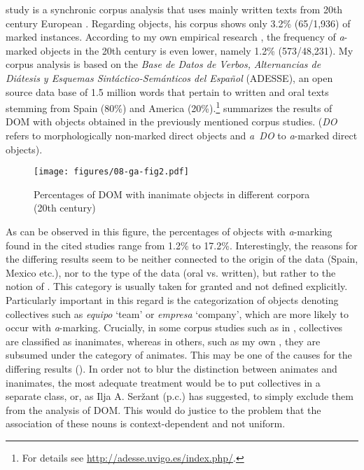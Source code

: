 \documentclass[output=paper]{LSP/langsci}
\begin{document}
 study is a synchronic corpus analysis that uses mainly written texts from 20th century European . Regarding  objects, his corpus shows only 3.2\% (65/1,936) of marked instances. According to my own empirical research \citep[71]{GarciaGarcia2014Objektmarkierung}, the frequency of \textit{a}-marked  objects in the 20th century is even lower, namely 1.2\% (573/48,231). My corpus analysis is based on the \textit{Base de Datos de Verbos,} \textit{Alternancias de Diátesis y Esquemas Sintáctico-Semánticos del Español} (ADESSE), an open source data base of 1.5 million words that pertain to written and oral texts stemming from Spain (80\%) and  America (20\%).\footnote{For details see \url{http://adesse.uvigo.es/index.php/}.}  summarizes the results of DOM with  objects obtained in the previously mentioned corpus studies. (\textit{DO} refers to morphologically non-marked direct objects and \textit{a~DO} to \textit{a}-marked direct objects). 

\begin{figure}
\texttt{[image: figures/08-ga-fig2.pdf]}
\caption{Percentages of DOM with inanimate objects in different corpora (20th century)}\label{08-ga-fig:2}
\end{figure}
 
As can be observed in this figure, the percentages of  objects with \textit{a}-marking found in the cited studies range from 1.2\% to 17.2\%. Interestingly, the reasons for the differing results seem to be neither connected to the origin of the data (Spain, Mexico etc.), nor to the type of the data (oral vs. written), but rather to the notion of . This category is usually taken for granted and not defined explicitly. Particularly important in this regard is the categorization of objects denoting collectives such as \textit{equipo} ‘team’ or \textit{empresa} ‘company’, which are more likely to occur with \textit{a}-marking. Crucially, in some corpus studies such as in \citet{Barraza2003Evolucion}, collectives are classified as inanimates, whereas in others, such as my own \citep{GarciaGarcia2014Objektmarkierung}, they are subsumed under the category of animates. This may be one of the causes for the differing results (\cf \citealt[72--75]{GarciaGarcia2014Objektmarkierung}). In order not to blur the distinction between animates and inanimates, the most adequate treatment would be to put collectives in a separate class, or, as Ilja A. Seržant (p.c.) has suggested, to simply exclude them from the analysis of DOM. This would do justice to the problem that the  association of these nouns is context-dependent and not uniform.
\end{document}
